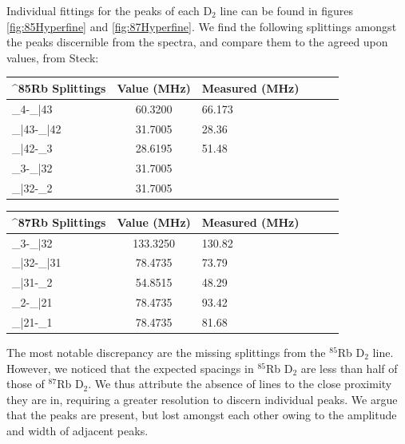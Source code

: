 \documentclass[12pt]{article}
\begin{document}
Individual fittings for the peaks of each D$_2$ line can be found in figures \ref{fig:85Hyperfine} and \ref{fig:87Hyperfine}.  We find the following splittings amongst the peaks discernible from the spectra, and compare them to the agreed upon values, from Steck\cite{steck85Rb}\cite{steck87Rb}:

\begin{center}
	\begin{tabular}{| L|c | L|c |L|c|}
		\hline
		{}^{85}Rb\textbf{ Splittings} & \textbf{Value (MHz)} & \textbf{Measured (MHz)}\\ 
		\hline
		\nu_{4}-\nu_{\bar{43}} & 60.3200 &  66.173\\ 
		\hline
		\nu_{\bar{43}}-\nu_{\bar{42}} & 31.7005 & 28.36\\ 
		\hline
		\nu_{\bar{42}}-\nu_{3} & 28.6195 & 51.48\\ 
		\hline
		\nu_{3}-\nu_{\bar{32}} & 31.7005 & \\ 
		\hline
		\nu_{\bar{32}}-\nu_2 & 31.7005 & \\
		\hline
	\end{tabular}
\end{center}
	\vspace{5mm}
\begin{center}
	\begin{tabular}{| L|c | L|c |L|c|}
		\hline
		{}^{87}Rb\textbf{ Splittings} & \textbf{Value (MHz)} & \textbf{Measured (MHz)} \\ 
		\hline
		\nu_{3}-\nu_{\bar{32}} & 133.3250 &130.82\\ 
		\hline
		\nu_{\bar{32}}-\nu_{\bar{31}} & 78.4735 & 73.79\\ 
		\hline
		\nu_{\bar{31}}-\nu_{2} & 54.8515 & 48.29\\ 
		\hline
		\nu_{2}-\nu_{\bar{21}} & 78.4735 & 93.42\\ 
		\hline
		\nu_{\bar{21}}-\nu_1 & 78.4735 & 81.68\\
		\hline
	\end{tabular}
\end{center}

The most notable discrepancy are the missing splittings from the ${}^{85}$Rb D$_2$ line.  However, we noticed that the expected spacings in ${}^{85}$Rb D$_2$ are less than half of those of ${}^{87}$Rb D$_2$.  We thus attribute the absence of lines to the close proximity they are in, requiring a greater resolution to discern individual peaks.  We argue that the peaks are present, but lost amongst each other owing to the amplitude and width of adjacent peaks.
\end{document}
